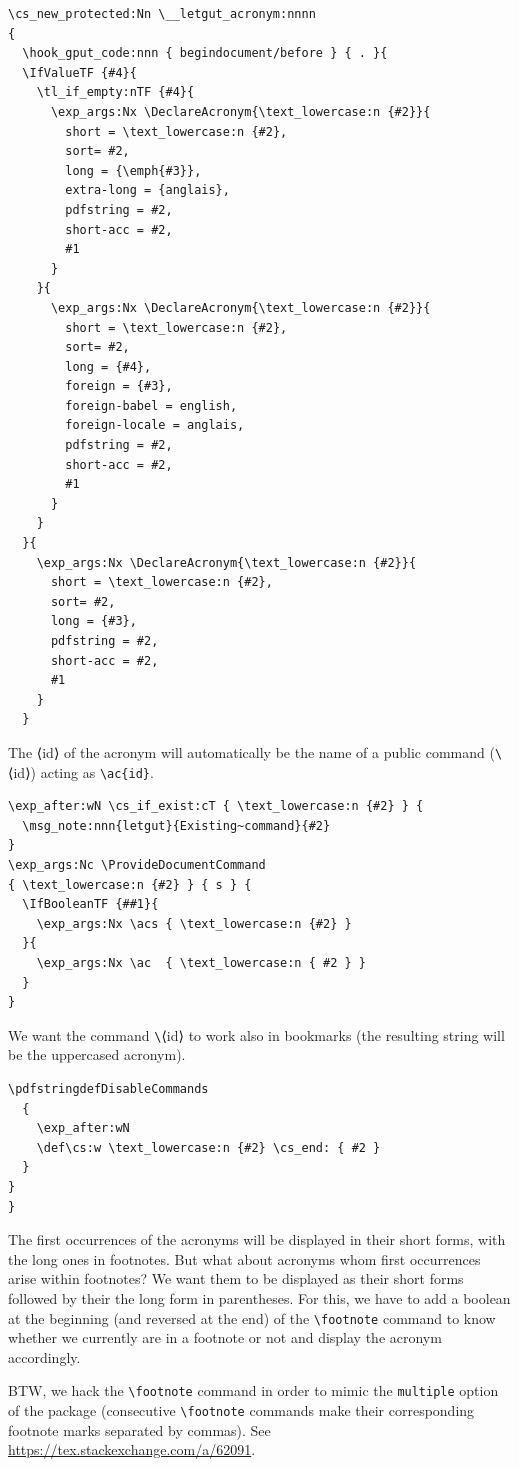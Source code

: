 \documentclass{letgut}
\begin{document}
\begin{lstlisting}
\cs_new_protected:Nn \__letgut_acronym:nnnn
{
  \hook_gput_code:nnn { begindocument/before } { . }{
  \IfValueTF {#4}{
    \tl_if_empty:nTF {#4}{
      \exp_args:Nx \DeclareAcronym{\text_lowercase:n {#2}}{
        short = \text_lowercase:n {#2},
        sort= #2,
        long = {\emph{#3}},
        extra-long = {anglais},
        pdfstring = #2,
        short-acc = #2,
        #1
      }
    }{
      \exp_args:Nx \DeclareAcronym{\text_lowercase:n {#2}}{
        short = \text_lowercase:n {#2},
        sort= #2,
        long = {#4},
        foreign = {#3},
        foreign-babel = english,
        foreign-locale = anglais,
        pdfstring = #2,
        short-acc = #2,
        #1
      }
    }
  }{
    \exp_args:Nx \DeclareAcronym{\text_lowercase:n {#2}}{
      short = \text_lowercase:n {#2},
      sort= #2,
      long = {#3},
      pdfstring = #2,
      short-acc = #2,
      #1
    }
  }
\end{lstlisting}
The ⟨id⟩ of the acronym will automatically be the name of a public command
(\lstinline+\+​⟨id⟩) acting as \lstinline+\ac{id}+.
\begin{lstlisting}
\exp_after:wN \cs_if_exist:cT { \text_lowercase:n {#2} } {
  \msg_note:nnn{letgut}{Existing~command}{#2}
}
\exp_args:Nc \ProvideDocumentCommand
{ \text_lowercase:n {#2} } { s } {
  \IfBooleanTF {##1}{
    \exp_args:Nx \acs { \text_lowercase:n {#2} }
  }{
    \exp_args:Nx \ac  { \text_lowercase:n { #2 } }
  }
}
\end{lstlisting}
We want the command \lstinline+\+​⟨id⟩ to work also in bookmarks (the resulting string will
be the uppercased acronym).
\begin{lstlisting}
\pdfstringdefDisableCommands
  {
    \exp_after:wN
    \def\cs:w \text_lowercase:n {#2} \cs_end: { #2 }
  }
}
}
\end{lstlisting}

The first occurrences of the acronyms will be displayed in their short forms,
with the long ones in footnotes. But what about acronyms whom first occurrences
arise within footnotes? We want them to be displayed as their short forms
followed by their the long form in parentheses. For this, we have to add
a boolean at the beginning (and reversed at the end) of the \lstinline+\footnote+ command
to know whether we currently are in a footnote or not and display the acronym
accordingly.

BTW, we hack the \lstinline+\footnote+ command in order to mimic the \lstinline+multiple+ option of
the  package (consecutive \lstinline+\footnote+ commands make their
corresponding footnote marks separated by commas). See
\url{https://tex.stackexchange.com/a/62091}.
\end{document}
